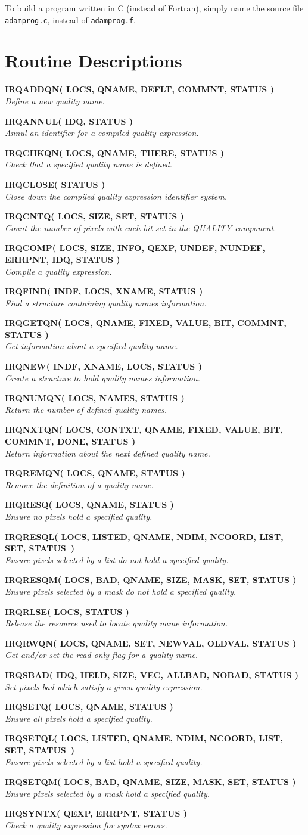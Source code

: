 \documentclass[twoside,11pt]{article}
\newcommand{\noteroutine}[2]{\textbf{#1}\hspace*{\fill}\nopagebreak \\
                             \hspace*{3em}\emph{#2}\hspace*{\fill}\par}
\renewcommand{\_}{\texttt{\symbol{95}}}
\begin{document}
To build a program written in C (instead of Fortran), simply name the
source file {\tt adamprog.c}, instead of {\tt adamprog.f}.

\newpage
\appendix
\section {Routine Descriptions}

\noteroutine{IRQ\_ADDQN( LOCS, QNAME, DEFLT, COMMNT, STATUS )}
   {Define a new quality name.}
\noteroutine{IRQ\_ANNUL( IDQ, STATUS )}
   {Annul an identifier for a compiled quality expression.}
\noteroutine{IRQ\_CHKQN( LOCS, QNAME, THERE, STATUS )}
   {Check that a specified quality name is defined.}
\noteroutine{IRQ\_CLOSE( STATUS )}
   {Close down the compiled quality expression identifier system.}
\noteroutine{IRQ\_CNTQ( LOCS, SIZE, SET, STATUS )}
   {Count the number of pixels with each bit set in the QUALITY component.}
\noteroutine{IRQ\_COMP( LOCS, SIZE, INFO, QEXP, UNDEF, NUNDEF, ERRPNT, IDQ, STATUS )}
   {Compile a quality expression.}
\noteroutine{IRQ\_FIND( INDF, LOCS, XNAME, STATUS )}
   {Find a structure containing quality names information.}
\noteroutine{IRQ\_GETQN( LOCS, QNAME, FIXED, VALUE, BIT, COMMNT, STATUS )}
   {Get information about a specified quality name.}
\noteroutine{IRQ\_NEW( INDF, XNAME, LOCS, STATUS )}
   {Create a structure to hold quality names information.}
\noteroutine{IRQ\_NUMQN( LOCS, NAMES, STATUS )}
   {Return the number of defined quality names.}
\noteroutine{IRQ\_NXTQN( LOCS, CONTXT, QNAME, FIXED, VALUE, BIT, COMMNT, DONE, STATUS )}
   {Return information about the next defined quality name.}
\noteroutine{IRQ\_REMQN( LOCS, QNAME, STATUS )}
   {Remove the definition of a quality name.}
\noteroutine{IRQ\_RESQ( LOCS, QNAME, STATUS )}
   {Ensure no pixels hold a specified quality.}
\noteroutine{IRQ\_RESQL( LOCS, LISTED, QNAME, NDIM, NCOORD, LIST, SET, STATUS~)}
   {Ensure pixels selected by a list do not hold a specified quality.}
\noteroutine{IRQ\_RESQM( LOCS, BAD, QNAME, SIZE, MASK, SET, STATUS )}
   {Ensure pixels selected by a mask do not hold a specified quality.}
\noteroutine{IRQ\_RLSE( LOCS, STATUS )}
   {Release the resource used to locate quality name information.}
\noteroutine{IRQ\_RWQN( LOCS, QNAME, SET, NEWVAL, OLDVAL, STATUS )}
   {Get and/or set the read-only flag for a quality name.}
\noteroutine{IRQ\_SBAD( IDQ, HELD, SIZE, VEC, ALLBAD, NOBAD, STATUS )}
   {Set pixels bad which satisfy a given quality expression.}
\noteroutine{IRQ\_SETQ( LOCS, QNAME, STATUS )}
   {Ensure all pixels hold a specified quality.}
\noteroutine{IRQ\_SETQL( LOCS, LISTED, QNAME, NDIM, NCOORD, LIST, SET,
STATUS~)}
   {Ensure pixels selected by a list hold a specified quality.}
\noteroutine{IRQ\_SETQM( LOCS, BAD, QNAME, SIZE, MASK, SET, STATUS )}
   {Ensure pixels selected by a mask hold a specified quality.}
\noteroutine{IRQ\_SYNTX( QEXP, ERRPNT, STATUS )}
   {Check a quality expression for syntax errors.}
\end{document}
